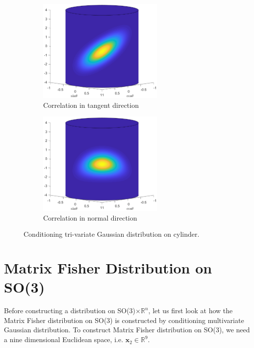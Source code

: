 \documentclass[12pt]{article}
\begin{document}
\begin{figure}[t!]
	\centering
	\begin{subfigure}[t]{0.5\textwidth}
		\centering
		\includegraphics[height=2in]{cylinder-tangent}
		\caption{Correlation in tangent direction}
	\end{subfigure}%
	\hfill
	\begin{subfigure}[t]{0.5\textwidth}
		\centering
		\includegraphics[height=2in]{cylinder-normal}
		\caption{Correlation in normal direction}
	\end{subfigure}
	\caption{Conditioning tri-variate Gaussian distribution on cylinder. \label{fig:cylinder}}
\end{figure}


\section{Matrix Fisher Distribution on SO(3) \label{sec:MatrixFisher}}
Before constructing a distribution on SO(3)$\times\mathbb{R}^n$, let us first look at how the Matrix Fisher distribution on SO(3) is constructed by conditioning multivariate Gaussian distribution.
To construct Matrix Fisher distribution on SO(3), we need a nine dimensional Euclidean space, i.e. $\bm{x}_2\in\mathbb{R}^{9}$.
\end{document}
